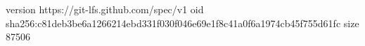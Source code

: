 version https://git-lfs.github.com/spec/v1
oid sha256:c81deb3be6a1266214ebd331f030f046e69e1f8c41a0f6a1974cb45f755d61fc
size 87506
